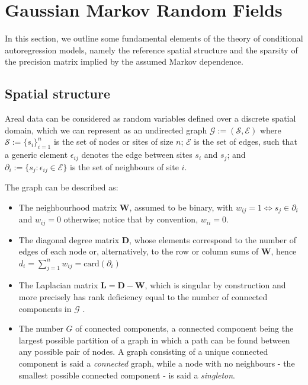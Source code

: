 \documentclass[openany, 11pt, oneside]{book}
\begin{document}
\section{Gaussian Markov Random Fields} \label{section:GMRFs}

In this section, we outline some fundamental elements of the theory of conditional autoregression models, namely the reference spatial structure and the sparsity of the precision matrix implied by the assumed Markov dependence.


\subsection{Spatial structure} \label{subsection:graph}

Areal data can be considered as random variables defined over a discrete spatial domain, which we can represent as an undirected graph $\mathcal{G}:=(\mathcal{S}, \mathcal{E})$ where $\mathcal{S}:= \lbrace s_i \rbrace_{i=1}^{n}$ is the set of nodes or sites of size $n$; $\mathcal{E}$ is the set of edges, such that a generic element $\epsilon_{ij}$ denotes the edge between sites $s_i$ and $s_j$; and $\partial_i := \lbrace s_j :\epsilon_{ij} \in \mathcal{E}\rbrace$ is the set of neighbours of site $i$. 

The graph can be described as:
\begin{itemize}
\item The neighbourhood matrix $\boldsymbol{W}$, assumed to be binary, with $w_{ij} = 1 \Longleftrightarrow s_j \in \partial _i$ and $w_{ij}=0$ otherwise; notice that by convention, $w_{ii}=0$. 
\item The diagonal degree matrix $\boldsymbol{D}$, whose elements correspond to the number of edges of each node or, alternatively, to the row or column sums of $\boldsymbol{W}$, hence $d_i = \sum_{j=1}^{n} w_{ij} = \mathrm{card}(\partial _i)$
\item The Laplacian matrix $\boldsymbol{L} =\boldsymbol{ D} - \boldsymbol{W}$, which is singular by construction and more precisely has rank deficiency equal to the number of connected components in $\mathcal{G}$ \parencite[see e.g.][]{ICAR, Hodges2003, SpectralClust}. 
\item The number $G$ of connected components, a connected component being the largest possible partition of a graph in which a path can be found between any possible pair of nodes. A graph consisting of a unique connected component is said a \textit{connected} graph, while a node with no neighbours - the smallest possible connected component - is said a \textit{singleton}.
\end{itemize}
\end{document}

